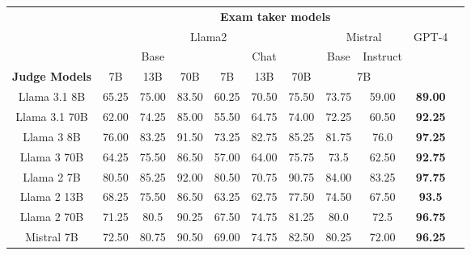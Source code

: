 \begin{table}[h]
\label{tab:eval-scores}
\centering
    \setlength{\tabcolsep}{5pt}
    \begin{tabular}{ccccccccccc}
    &  \multicolumn{9}{c}{\textbf{Exam taker models}} \\
    \cmidrule{2-10}
    & \multicolumn{6}{c}{Llama2} & \multicolumn{2}{c}{Mistral} & GPT-4 \\ 
    & \multicolumn{3}{c}{Base} & \multicolumn{3}{c}{Chat} & Base & Instruct \\
\textbf{Judge Models} & 7B  & 13B & 70B & 7B & 13B & 70B & \multicolumn{2}{c}{7B} \\
\cmidrule[1pt]{2-10}
Llama 3.1 8B & 65.25 & 75.00 & 83.50 & 60.25 & 70.50 & 75.50 & 73.75 & 59.00 & \textbf{89.00} \\ 
Llama 3.1 70B & 62.00 & 74.25 & 85.00 & 55.50 & 64.75 & 74.00 & 72.25 & 60.50 & \textbf{92.25} \\ \midrule
Llama 3 8B & 76.00 & 83.25 & 91.50 & 73.25 & 82.75 & 85.25 & 81.75 & 76.0 & \textbf{97.25} \\ 
Llama 3 70B & 64.25 & 75.50 & 86.50 & 57.00 & 64.00 & 75.75 & 73.5 & 62.50 & \textbf{92.75} \\ \midrule
Llama 2 7B & 80.50 & 85.25 & 92.00 & 80.50 & 70.75 & 90.75 & 84.00 & 83.25 & \textbf{97.75} \\ 
Llama 2 13B & 68.25 & 75.50 & 86.50 & 63.25 & 62.75 & 77.50 & 74.50 & 67.50 & \textbf{93.5} \\ 
Llama 2 70B & 71.25 & 80.5 & 90.25 & 67.50 & 74.75 & 81.25 & 80.0 & 72.5 & \textbf{96.75} \\ \midrule
Mistral 7B & 72.50 & 80.75 & 90.50 & 69.00 & 74.75 & 82.50 & 80.25 & 72.00 & \textbf{96.25} \\ \midrule

\end{tabular}
\end{table}
